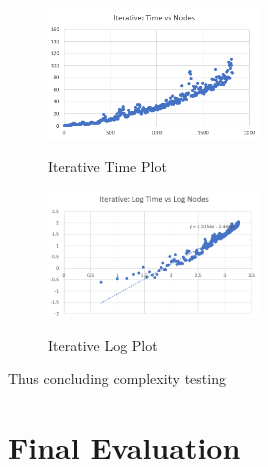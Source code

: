 \documentclass{article}
\begin{document}
\begin{figure}[!h]
    \caption{Iterative Time Plot}
    \centering
    \includegraphics[width=0.5\textwidth]{images/TimeIterative.png}
    \label{fig:TimeIterative}
\end{figure}
\bigbreak
\begin{figure}[!h]
    \caption{Iterative Log Plot}
    \centering
    \includegraphics[width=0.5\textwidth]{images/LogIterative.png}
    \label{fig:LogIterative}
\end{figure}
\bigbreak
Thus concluding complexity testing

\newpage
\section{Final Evaluation}
\end{document}
